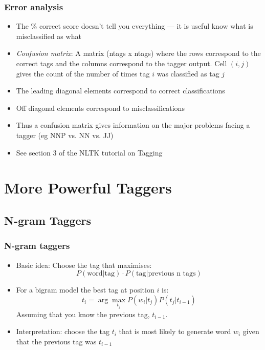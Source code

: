 \documentclass{beamer}
\begin{document}
\begin{frame}
  \frametitle{Error analysis}
  \begin{itemize}
  \item The \% correct score doesn't tell you everything --- it is
    useful know what is misclassified as what
  \item \emph{Confusion matrix}: A matrix (ntags x ntags) where the rows
    correspond to the correct tags and the columns correspond to the
    tagger output.  Cell $(i,j)$ gives the count of the number of
    times tag $i$ was classified as tag $j$
  \item The leading diagonal elements correspond to correct
    classifications
  \item Off diagonal elements correspond to misclassifications 
  \item Thus a confusion matrix gives information on the major
    problems facing a tagger (eg NNP vs. NN vs. JJ)
  \item See section 3 of the NLTK tutorial on Tagging
  \end{itemize}
\end{frame}


\section{More Powerful Taggers}

\subsection{N-gram Taggers}

\begin{frame}
  \frametitle{N-gram taggers}
  \begin{itemize}
  \item Basic idea:  Choose the tag  that maximises:
    \[ P(\mbox{word} | \mbox{tag}) \cdot 
       P(\mbox{tag} | \mbox{previous n tags}) \]
       
  \item For a bigram model the best tag at position $i$ is:
    \[ t_i = \arg\max_{t_j} P(w_i|t_j) P(t_j | t_{i-1}) \]
    Assuming that you know the previous tag, $t_{i-1}$.
  \item Interpretation: choose the tag $t_i$ that is most likely to
    \alert{generate} word $w_i$ given that the previous tag was $t_{i-1}$ 
  \end{itemize}
\end{frame}
\end{document}
